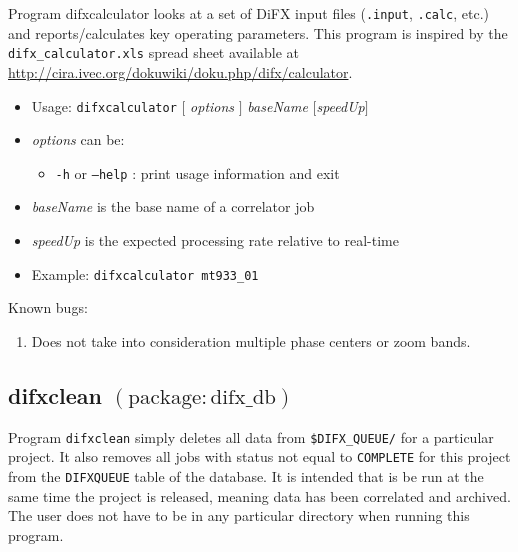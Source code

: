 Program difxcalculator looks at a set of DiFX input files ({\tt .input}, {\tt .calc}, etc.) and reports/calculates key operating parameters.
This program is inspired by the {\tt difx\_calculator.xls} spread sheet available at \url{http://cira.ivec.org/dokuwiki/doku.php/difx/calculator}.

\begin{itemize}
\item[] Usage: {\tt difxcalculator} $[$ {\em options} $]$ {\em baseName} $[${\em speedUp}$]$
\item[] {\em options} can be:
\begin{itemize}
\item[] {\tt -h} or {\tt --help} : print usage information and exit
\end{itemize}
\item[] {\em baseName} is the base name of a correlator job
\item[] {\em speedUp} is the expected processing rate relative to real-time
\item[] Example: {\tt difxcalculator mt933\_01}
\end{itemize}

\noindent
Known bugs:
\begin{enumerate}
\item Does not take into consideration multiple phase centers or zoom bands.
\end{enumerate}







\subsection{difxclean {\small $\mathrm{(package: difx\_db)}$}} \label{sec:difxclean}

Program {\tt difxclean} simply deletes all data from {\tt \$DIFX\_QUEUE/} for a particular project.
It also removes all jobs with status not equal to {\tt COMPLETE} for this project from the {\tt DIFXQUEUE} table of the database.
It is intended that is be run at the same time the project is released, meaning data has been correlated and archived.
The user does not have to be in any particular directory when running this program.

